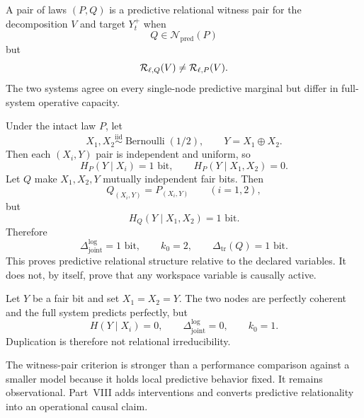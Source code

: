 
\begin{definition}\label{def:relational-witness}
A pair of laws \((P,Q)\) is a predictive relational witness pair for the
decomposition \(V\) and target \(Y_t^+\) when
\[
Q\in\mathcal N_{\mathrm{pred}}(P)
\]
but
\[
\mathcal R_{\ell,Q}(V)
\neq
\mathcal R_{\ell,P}(V).
\]
The two systems agree on every single-node predictive marginal but differ in
full-system operative capacity.
\end{definition}

\begin{example}\label{ex:xor-witness}
Under the intact law \(P\), let
\[
X_1,X_2\overset{\mathrm{iid}}{\sim}\operatorname{Bernoulli}(1/2),
\qquad
Y=X_1\oplus X_2.
\]
Then each \((X_i,Y)\) pair is independent and uniform, so
\[
H_P(Y\mid X_i)=1\text{ bit},
\qquad
H_P(Y\mid X_1,X_2)=0.
\]
Let \(Q\) make \(X_1,X_2,Y\) mutually independent fair bits. Then
\[
Q_{(X_i,Y)}=P_{(X_i,Y)}
\qquad(i=1,2),
\]
but
\[
H_Q(Y\mid X_1,X_2)=1\text{ bit}.
\]
Therefore
\[
\Delta_{\mathrm{joint}}^{\log}=1\text{ bit},
\qquad
k_0=2,
\qquad
\Delta_{\mathrm{tr}}(Q)=1\text{ bit}.
\]
This proves predictive relational structure relative to the declared variables.
It does not, by itself, prove that any workspace variable is causally active.
\end{example}

\begin{example}
Let \(Y\) be a fair bit and set \(X_1=X_2=Y\). The two nodes are perfectly
coherent and the full system predicts perfectly, but
\[
H(Y\mid X_i)=0,
\qquad
\Delta_{\mathrm{joint}}^{\log}=0,
\qquad
k_0=1.
\]
Duplication is therefore not relational irreducibility.
\end{example}

The witness-pair criterion is stronger than a performance comparison against a
smaller model because it holds local predictive behavior fixed. It remains
observational. Part~VIII adds interventions and converts predictive
relationality into an operational causal claim.
